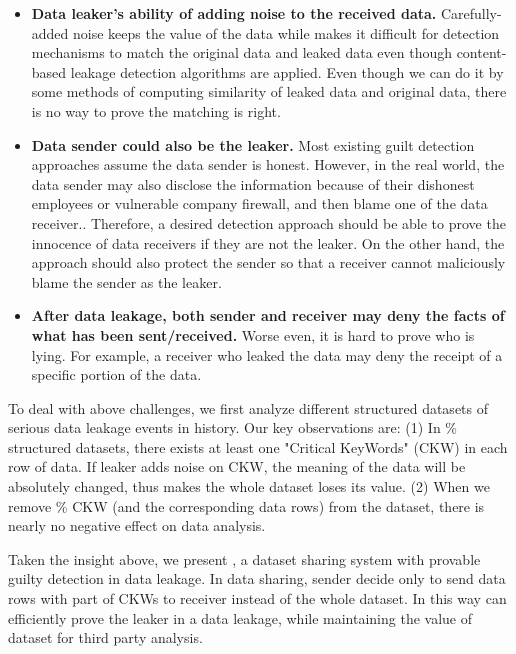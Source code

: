 \begin{itemize}
\item \textbf{Data leaker's ability of adding noise to the received data.}
Carefully-added noise keeps the value of the data while makes it difficult for detection mechanisms to match the original data and leaked data even though content-based leakage detection algorithms are applied. Even though we can do it by some methods of computing similarity of leaked data and original data, there is no way to prove the matching is right.

\item \textbf{Data sender could also be the leaker.}
Most existing guilt detection approaches assume the data sender is honest. 
However, in the real world, the data sender may also disclose the information because of their dishonest employees or vulnerable company firewall, and then blame one of the data receiver..
Therefore, a desired detection approach should be able to prove the innocence of data receivers if they are not the leaker.
On the other hand, the approach should also protect the sender so that a receiver cannot maliciously blame the sender as the leaker.

\item \textbf{After data leakage, both sender and receiver may deny the facts of what has been sent/received.}
Worse even, it is hard to prove who is lying.
For example, a receiver who leaked the data may deny the receipt of a specific portion of the data.
\end{itemize}

To deal with above challenges, we first analyze \fillme different structured datasets of \fillme serious data leakage events in history. Our key observations are: (1) In \fillme\% structured datasets, there exists at least one "Critical KeyWords" (CKW) in each row of data. If leaker adds noise on CKW, the meaning of the data will be absolutely changed, thus makes the whole dataset loses its value. (2) When we remove \fillme\% CKW (and the corresponding data rows) from the dataset, there is nearly no negative effect on data analysis. 

Taken the insight above, we present \name, a dataset sharing system with provable guilty detection in data leakage. In data sharing, sender decide only to send data rows with part of CKWs to receiver instead of the whole dataset. In this way \name can efficiently prove the leaker in a data leakage, while maintaining the value of dataset for third party analysis.

